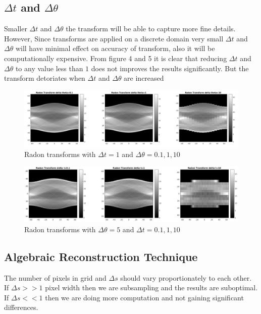 \documentclass[11pt]{article}
\begin{document}
\subsection{$\Delta t$ and $\Delta \theta$}
Smaller $\Delta t$ and $\Delta \theta$ the transform will be able to capture more fine details. However, Since transforms are applied on a discrete domain very small $\Delta t$ and $\Delta \theta$ will have minimal effect on accuracy of transform, also it will be computationally expensive.
From figure 4 and 5 it is clear that reducing $\Delta t$ and $\Delta \theta$ to any value less than $1$ does not improves the results significantly.
But the transform detoriates when $\Delta t$ and $\Delta \theta$ are increased
\begin{figure}[h]
\centering
\includegraphics[scale=0.3]{d}
\caption{Radon transforms with $\Delta t = 1$ and $\Delta \theta = 0.1,1,10$}
\end{figure}
\begin{figure}[h]
\centering
\includegraphics[scale=0.3]{d2}
\caption{Radon transforms with $\Delta \theta = 5$ and $\Delta t = 0.1,1,10$}
\end{figure}


\subsection{Algebraic Reconstruction Technique}
The number of pixels in grid and $\Delta s$ should vary proportionately to each other.
If $\Delta s >> 1$ pixel width then we are subsampling and the results are suboptimal.
If $\Delta s << 1$ then we are doing more computation and not gaining significant differences.
\end{document}
